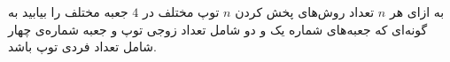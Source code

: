     \p 
به ازای هر
$n$
تعداد روش‌های پخش کردن
$n$
توپ مختلف در
$4$
جعبه مختلف را بیابید به گونه‌ای که جعبه‌های شماره یک و دو شامل تعداد زوجی توپ و جعبه شماره‌ی چهار شامل تعداد فردی توپ باشد.